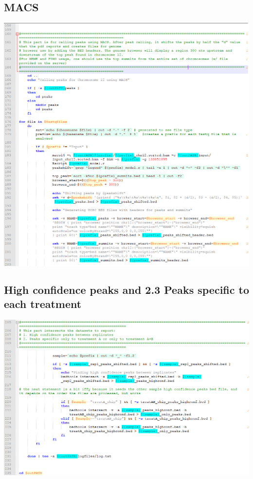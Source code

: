 \documentclass[a4paper,11pt]{article}
\begin{document}
\subsection{MACS}
\noindent \includegraphics[scale=0.75]{MACS1.PNG}
\pagebreak
\subsection{High confidence peaks and 2.3 Peaks specific to each treatment}
\noindent \includegraphics[scale=0.75]{MACS2.PNG} \\
\end{document}
